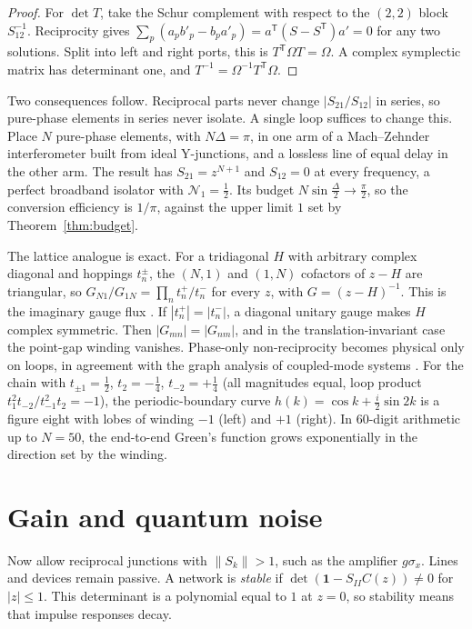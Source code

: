 \documentclass[aps,pra,twocolumn,superscriptaddress,floatfix,nofootinbib]{revtex4-2}
\theoremstyle{definition}
\newcommand{\NN}{\mathcal N_1}
\newcommand{\one}{\mathbf 1}
\newcommand{\T}{\mathsf T}
\begin{document}
\begin{proof}
For $\det T$, take the Schur complement with respect to the $(2,2)$ block $S_{12}^{-1}$. Reciprocity gives $\sum_p(a_pb'_p-b_pa'_p)=a^\T(S-S^\T)a'=0$ for any two solutions. Split into left and right ports, this is $T^\T\Omega T=\Omega$. A complex symplectic matrix has determinant one, and $T^{-1}=\Omega^{-1}T^\T\Omega$.
\end{proof}

Two consequences follow. Reciprocal parts never change $|S_{21}/S_{12}|$ in series, so pure-phase elements in series never isolate. A single loop suffices to change this. Place $N$ pure-phase elements, with $N\Delta=\pi$, in one arm of a Mach--Zehnder interferometer built from ideal Y-junctions, and a lossless line of equal delay in the other arm. The result has $S_{21}=z^{N+1}$ and $S_{12}=0$ at every frequency, a perfect broadband isolator with $\NN=\frac12$. Its budget $N\sin\frac\Delta2\to\frac\pi2$, so the conversion efficiency is $1/\pi$, against the upper limit $1$ set by Theorem~\ref{thm:budget}.

The lattice analogue is exact. For a tridiagonal $H$ with arbitrary complex diagonal and hoppings $t^\pm_n$, the $(N,1)$ and $(1,N)$ cofactors of $z-H$ are triangular, so $G_{N1}/G_{1N}=\prod_nt^+_n/t^-_n$ for every $z$, with $G=(z-H)^{-1}$. This is the imaginary gauge flux \cite{HN96}. If $|t^+_n|=|t^-_n|$, a diagonal unitary gauge makes $H$ complex symmetric. Then $|G_{mn}|=|G_{nm}|$, and in the translation-invariant case the point-gap winding vanishes. Phase-only non-reciprocity becomes physical only on loops, in agreement with the graph analysis of coupled-mode systems \cite{RA15}. For the chain with $t_{\pm1}=\frac12$, $t_2=-\frac14$, $t_{-2}=+\frac14$ (all magnitudes equal, loop product $t_1^2t_{-2}/t_{-1}^2t_2=-1$), the periodic-boundary curve $h(k)=\cos k+\frac i2\sin2k$ is a figure eight with lobes of winding $-1$ (left) and $+1$ (right). In 60-digit arithmetic up to $N=50$, the end-to-end Green's function grows exponentially in the direction set by the winding.

\section{Gain and quantum noise}\label{sec:gain}

Now allow reciprocal junctions with $\|S_k\|>1$, such as the amplifier $g\sigma_x$. Lines and devices remain passive. A network is \emph{stable} if $\det(\one-S_{II}C(z))\neq0$ for $|z|\le1$. This determinant is a polynomial equal to $1$ at $z=0$, so stability means that impulse responses decay.
\end{document}
